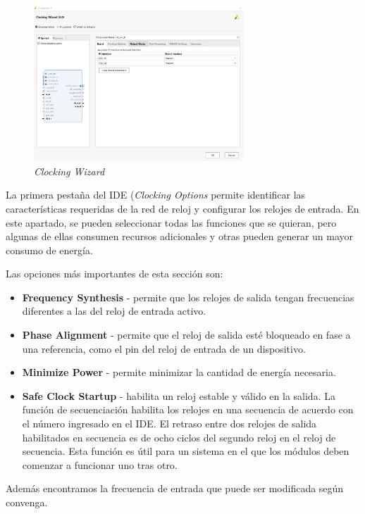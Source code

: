 \begin{figure}[H]
    \centering
    \includegraphics[width = 0.7\textwidth]{imagenes/clockingwizard.png}
    \caption{\textit{Clocking Wizard}}\label{clockingwizard}
\end{figure}

La primera pestaña del IDE (\textit{Clocking Options} permite identificar las características requeridas de la red de reloj y 
configurar los relojes de entrada. En este apartado, se pueden seleccionar todas las funciones que se quieran, pero algunas de 
ellas consumen recursos adicionales y otras pueden generar un mayor consumo de energía.

Las opciones más importantes de esta sección son:

\begin{itemize}
    \item \textbf{Frequency Synthesis} - permite que los relojes de salida tengan frecuencias diferentes a las del reloj de entrada activo.
    \item \textbf{Phase Alignment} - permite que el reloj de salida esté bloqueado en fase a una referencia, como el pin del reloj de entrada de un dispositivo.
    \item \textbf{Minimize Power} - permite minimizar la cantidad de energía necesaria.
    \item \textbf{Safe Clock Startup} - habilita un reloj estable y válido en la salida. La función de secuenciación habilita los relojes en una secuencia 
    de acuerdo con el número ingresado en el IDE. El retraso entre dos relojes de salida habilitados en secuencia es de ocho ciclos del segundo reloj en 
    el reloj de secuencia. Esta función es útil para un sistema en el que los módulos deben comenzar a funcionar uno tras otro.
\end{itemize}

Además encontramos la frecuencia de entrada que puede ser modificada según convenga.

